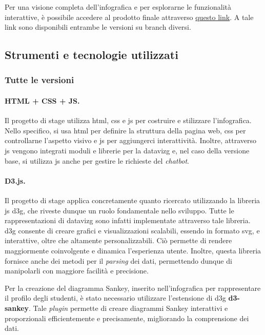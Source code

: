 Per una visione completa dell'infografica e per esplorarne le funzionalità interattive, è possibile accedere al prodotto finale attraverso \href{https://www.google.com/}{questo link}.
A tale link sono disponibili entrambe le versioni su branch diversi.


\subsection{Strumenti e tecnologie utilizzati}\label{subsec:tecnologie}
\subsubsection{Tutte le versioni}
\paragraph{HTML + CSS + JS.}
Il progetto di stage utilizza \gls{html}, \gls{css} e \gls{js} per costruire e stilizzare l'infografica. Nello specifico, si usa \gls{html} per definire la struttura della pagina web, \gls{css} per controllarne l'aspetto visivo 
e \gls{js} per aggiungerci interattività. Inoltre, attraverso \gls{js} vengono integrati moduli e librerie per la \gls{datavizg} e, nel caso della versione base, si utilizza \gls{js} anche per gestire le richieste del \emph{chatbot}.

\paragraph{D3.js.}
Il progetto di stage applica concretamente quanto ricercato utilizzando la libreria \gls{js} \gls{d3g}, che riveste dunque un ruolo fondamentale nello sviluppo.
Tutte le rappresentazioni di \gls{datavizg} sono infatti implementate attraverso tale libreria.
\gls{d3g} consente di creare grafici e visualizzazioni scalabili, essendo in formato \gls{svg}, e interattive, oltre che altamente personalizzabili. 
Ciò permette di rendere maggiormente coinvolgente e dinamica l'esperienza utente. 
Inoltre, questa libreria fornisce anche dei metodi per il \emph{parsing} dei dati, permettendo dunque di manipolarli con maggiore facilità e precisione.

Per la creazione del diagramma Sankey, inserito nell'infografica per rappresentare il profilo degli studenti, è stato necessario utilizzare l'estensione di \gls{d3g}
\textbf{d3-sankey}. Tale \emph{plugin} permette di creare diagrammi Sankey interattivi e proporzionali efficientemente e precisamente, migliorando la comprensione dei dati.

